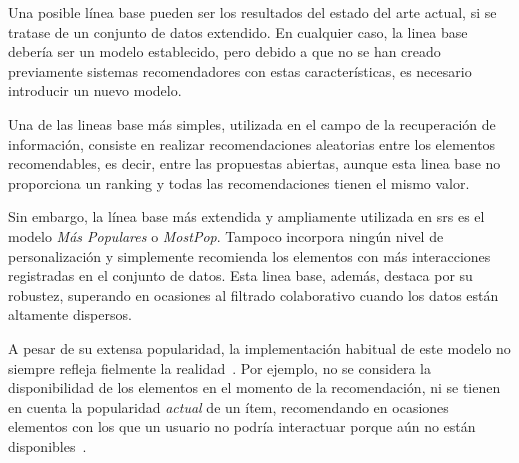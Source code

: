 Una posible línea base pueden ser los resultados del estado del arte actual, si se tratase de un conjunto de datos extendido. En cualquier caso, la linea base debería ser un modelo establecido, pero debido a que no se han creado previamente sistemas recomendadores con estas características, es necesario introducir un nuevo modelo.

Una de las lineas base más simples, utilizada en el campo de la recuperación de información, consiste en realizar recomendaciones aleatorias entre los elementos recomendables, es decir, entre las propuestas abiertas, aunque esta linea base no proporciona un ranking y todas las recomendaciones tienen el mismo valor. 

Sin embargo, la línea base más extendida y ampliamente utilizada en \glspl{sr} es el modelo \textit{Más Populares} o \textit{MostPop}. Tampoco incorpora ningún nivel de personalización y simplemente recomienda los elementos con más interacciones registradas en el conjunto de datos. Esta linea base, además, destaca por su robustez, superando en ocasiones al filtrado colaborativo cuando los datos están altamente dispersos.

A pesar de su extensa popularidad, la implementación habitual de este modelo no siempre refleja fielmente la realidad~\cite{rendle_difficulty_2019}. Por ejemplo, no se considera la disponibilidad de los elementos en el momento de la recomendación, ni se tienen en cuenta la popularidad \textit{actual} de un ítem, recomendando en ocasiones elementos con los que un usuario no podría interactuar porque aún no están disponibles~\cite{ji_re-visit_2020}.

    
